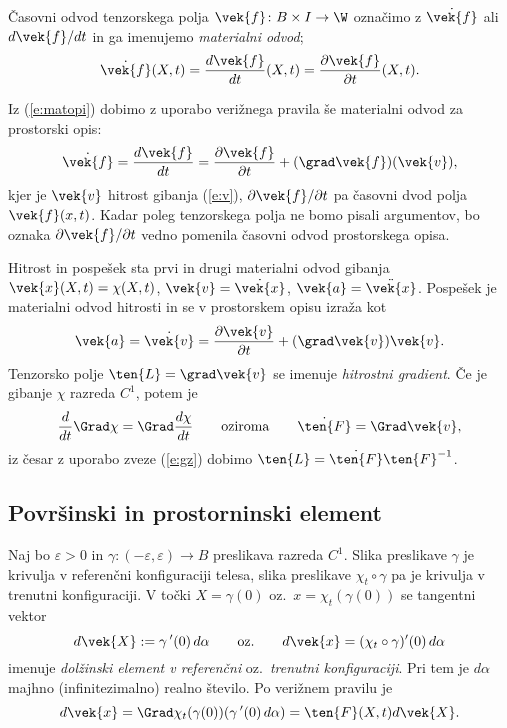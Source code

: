 \begin{definicija}
	Časovni odvod tenzorskega polja $\vek{f}\colon B\times I\to\W$ označimo z
	$\dot{\vek{f}}$ ali $d\vek{f}/dt$ in ga imenujemo \emph{materialni odvod};
	\[ \dot{\vek{f}}(X,t)=\frac{d\vek{f}}{dt}(X,t)=\frac{\partial\vek{f}}{\partial t}(X,t). \]
\end{definicija}
Iz (\ref{e:matopi}) dobimo z uporabo verižnega pravila še materialni odvod za prostorski opis:
\[
	\dot{\vek{f}}=\frac{d\vek{f}}{dt}=
	\frac{\partial\vek{f}}{\partial t}+(\grad\vek{f})(\vek{v}),
\]
kjer je $\vek{v}$ hitrost gibanja (\ref{e:v}), $\partial\vek{f}/\partial t$ pa
časovni dvod polja $\vek{f}(x,t)$. Kadar poleg tenzorskega polja ne bomo pisali argumentov,
bo oznaka $\partial\vek{f}/\partial t$ vedno pomenila časovni odvod prostorskega opisa.

\begin{primer} %
	Hitrost in pospešek sta prvi in drugi materialni odvod gibanja $\vek{x}(X,t)=\chi(X,t)$,
	$\vek{v}=\dot{\vek{x}}$, $\vek{a}=\ddot{\vek{x}}$.
	Pospešek je materialni odvod hitrosti in se v prostorskem opisu izraža kot
	\[ \vek{a}=\dot{\vek{v}}=\frac{\partial\vek{v}}{\partial t}+(\grad\vek{v})\vek{v}. \]
	Tenzorsko polje $\ten{L}=\grad\vek{v}$ se imenuje \emph{hitrostni gradient}.
	Če je gibanje $\chi$ razreda $C^1$, potem je
	\[
		\frac{d}{dt}\Grad\chi=\Grad\frac{d\chi}{dt}\qquad\textrm{oziroma}\qquad
		\dot{\ten{F}}=\Grad\vek{v},
	\]
	iz česar z uporabo zveze (\ref{e:gz}) dobimo $\ten{L}=\dot{\ten{F}}\ten{F}^{-1}$.
\end{primer}


\subsection{Površinski in prostorninski element}


Naj bo $\varepsilon>0$ in $\gamma\colon(-\varepsilon,\varepsilon)\to B$ preslikava
razreda $C^1$. Slika preslikave $\gamma$ je krivulja v referenčni konfiguraciji telesa,
slika preslikave $\chi_t\circ\gamma$ pa je krivulja v trenutni konfiguraciji.
V točki $X=\gamma(0)$ oz.~$x=\chi_t(\gamma(0))$ se tangentni vektor
\[
	d\vek{X}:=\gamma\,'(0)\,d\alpha\qquad\textrm{oz.}\qquad d\vek{x}=(\chi_t\circ\gamma)'(0)\,d\alpha
\]
imenuje \emph{dolžinski element v referenčni} oz.~\emph{trenutni konfiguraciji}. Pri tem
je $d\alpha$ majhno (infinitezimalno) realno število. Po verižnem pravilu je
\[ d\vek{x}=\Grad\chi_t(\gamma(0))(\gamma\,'(0)\,d\alpha)=\ten{F}(X,t)d\vek{X}. \]

